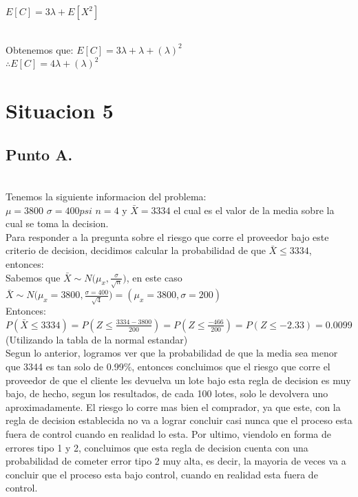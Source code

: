 \documentclass[letterpaper,12pt,onecolumn,titlepage]{article}
\begin{document}
$E[C]=3\lambda + E[X^2]$

~\\Obtenemos que: 
$E[C]=3\lambda + \lambda + (\lambda)^2$
~\\$\therefore E[C] = 4\lambda + (\lambda)^2$

\section{Situacion 5}
\subsection{Punto A.}
~\\ Tenemos la siguiente informacion del problema:
~\\ $\mu=3800$  $\sigma=400psi$ $n=4$ y $\bar{X}=3334$ el cual es el valor de la media sobre la cual se toma la decision.
~\\ Para responder a la pregunta sobre el riesgo que corre el proveedor bajo este criterio de decision, decidimos calcular la probabilidad de que $\bar{X}\leq3334$, entonces:
~\\ Sabemos que $\bar{X}\sim{N(\mu_x,\frac{\sigma}{\sqrt{n}}})$, en este caso $\bar{X}\sim{N(\mu_x=3800,\frac{\sigma=400}{\sqrt{4}}})=(\mu_x=3800,\sigma=200)$
~\\Entonces:
~\\ $P(\bar{X}\leq3334)=P(Z\leq\frac{3334-3800}{200})=P(Z\leq\frac{-466}{200})=P(Z\leq-2.33)=0.0099$ (Utilizando la tabla de la normal estandar)
~\\Segun lo anterior, logramos ver que la probabilidad de que la media sea menor que 3344 es tan solo de 0.99\%, entonces concluimos que el riesgo que corre el proveedor de que el cliente les devuelva un lote bajo esta regla de decision es muy bajo, de hecho, segun los resultados, de cada 100 lotes, solo le devolvera uno aproximadamente. El riesgo lo corre mas bien el comprador, ya que este, con la regla de decision establecida no va a lograr concluir casi nunca que el proceso esta fuera de control cuando en realidad lo esta. Por ultimo, viendolo en forma de errores tipo 1 y 2, concluimos que esta regla de decision cuenta con una probabilidad de cometer error tipo 2 muy alta, es decir, la mayoria de veces va a concluir que el proceso esta bajo control, cuando en realidad esta fuera de control.
\end{document}

